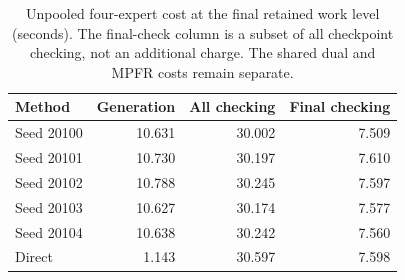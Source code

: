 \begin{table}[htbp]\centering\small
\caption{Unpooled four-expert cost at the final retained work level (seconds). The final-check column is a subset of all checkpoint checking, not an additional charge. The shared dual and MPFR costs remain separate.}
\begin{tabular}{lrrr}\toprule
Method & Generation & All checking & Final checking \\ \midrule
Seed 20100 & 10.631 & 30.002 & 7.509 \\
Seed 20101 & 10.730 & 30.197 & 7.610 \\
Seed 20102 & 10.788 & 30.245 & 7.597 \\
Seed 20103 & 10.627 & 30.174 & 7.577 \\
Seed 20104 & 10.638 & 30.242 & 7.560 \\
Direct & 1.143 & 30.597 & 7.598 \\
\bottomrule\end{tabular}
\end{table}
